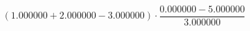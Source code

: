 \documentclass{article}
\begin{document}
$$(1.000000 + 2.000000 - 3.000000) \cdot \frac{0.000000 - 5.000000}{3.000000}$$
\end{document}

